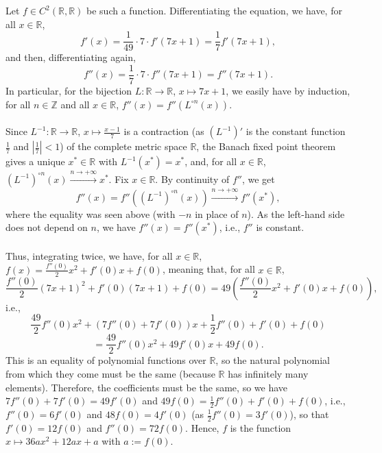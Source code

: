 \begin{solution}
    Let \( f \in C^2\left(\mathbb{R},\mathbb{R}\right) \) be such a function. Differentiating the equation, we have, for all \( x \in \mathbb{R} \),
    \[
        f'\left(x\right) = \frac{1}{49} \cdot 7 \cdot f'\left(7x+1\right) = \frac{1}{7}f'\left(7x+1\right),
    \]
    and then, differentiating again,
    \[
        f''\left(x\right) = \frac{1}{7} \cdot 7 \cdot f''\left(7x+1\right) = f''\left(7x+1\right).
    \]
    In particular, for the bijection \( L \colon \mathbb{R} \to \mathbb{R} \), \( x \mapsto 7x+1 \), we easily have by induction, for all \( n \in \mathbb{Z} \) and all \( x \in \mathbb{R} \), \( f''\left(x\right) = f''\left(L^{\circ n}\left(x\right)\right) \).
    \\\\
    Since \( L^{-1} \colon \mathbb{R} \to \mathbb{R} \), \( x \mapsto \frac{x-1}{7} \) is a contraction (as \( \left(L^{-1}\right)' \) is the constant function \( \frac{1}{7} \) and \( \left|\frac{1}{7}\right| < 1 \)) of the complete metric space \( \mathbb{R} \), the Banach fixed point theorem gives a unique \( x^{*} \in \mathbb{R} \) with \( L^{-1}\left(x^{*}\right) = x^{*} \), and, for all \( x \in \mathbb{R} \), \( \left(L^{-1}\right)^{\circ n}\left(x\right) \overset{n \to +\infty}{\longrightarrow} x^{*} \). Fix \( x \in \mathbb{R} \). By continuity of \( f'' \), we get
    \[
        f''\left(x\right) = f''\left(\left(L^{-1}\right)^{\circ n}\left(x\right)\right) \overset{n \to +\infty}{\longrightarrow} f''\left(x^{*}\right),
    \]
    where the equality was seen above (with \( -n \) in place of \( n \)). As the left-hand side does not depend on \( n \), we have \( f''\left(x\right) = f''\left(x^{*}\right) \), i.e., \( f'' \) is constant.
    \\\\
    Thus, integrating twice, we have, for all \( x \in \mathbb{R} \), \( f\left(x\right) = \frac{f''\left(0\right)}{2}x^2+f'\left(0\right)x+f\left(0\right) \), meaning that, for all \( x \in \mathbb{R} \),
    \[
        \frac{f''\left(0\right)}{2}\left(7x+1\right)^2+f'\left(0\right)\left(7x+1\right)+f\left(0\right) = 49\left(\frac{f''\left(0\right)}{2}x^2+f'\left(0\right)x+f\left(0\right)\right),
    \]
    i.e.,
    \[
        \frac{49}{2}f''\left(0\right)x^2+\left(7f''\left(0\right)+7f'\left(0\right)\right)x+\frac{1}{2}f''\left(0\right)+f'\left(0\right)+f\left(0\right)
    \]
    \[
        = \frac{49}{2}f''\left(0\right)x^2+49f'\left(0\right)x+49f\left(0\right).
    \]
    This is an equality of polynomial functions over \( \mathbb{R} \), so the natural polynomial from which they come must be the same (because \( \mathbb{R} \) has infinitely many elements). Therefore, the coefficients must be the same, so we have \( 7f''\left(0\right)+7f'\left(0\right) = 49f'\left(0\right) \) and \( 49f\left(0\right) = \frac{1}{2}f''\left(0\right)+f'\left(0\right)+f\left(0\right) \), i.e., \( f''\left(0\right) = 6f'\left(0\right) \) and \( 48f\left(0\right) = 4f'\left(0\right) \) (as \( \frac{1}{2}f''\left(0\right) = 3f'\left(0\right) \)), so that \( f'\left(0\right) = 12f\left(0\right) \) and \( f''\left(0\right) = 72f\left(0\right) \). Hence, \( f \) is the function \( x \mapsto 36ax^2+12ax+a \) with \( a := f\left(0\right) \).

\end{solution}
